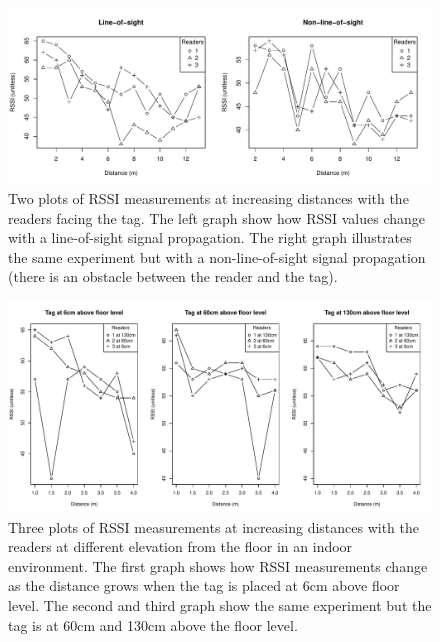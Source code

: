 \documentclass[a4paper,12pt]{article}
\begin{document}
\begin{figure}
	\begin{center}
		\includegraphics[width=1\textwidth]{rssi_distance_13m}
		\caption{Two plots of RSSI measurements at increasing distances with the readers facing the tag. The left graph show how RSSI values change with a line-of-sight signal propagation. The right graph illustrates the same experiment but with a non-line-of-sight signal propagation (there is an obstacle between the reader and the tag).}
	\end{center}
\end{figure}
\begin{figure}
	\begin{center}
		\includegraphics[width=1\textwidth]{rssi_distance_4m}
		\caption{Three plots of RSSI measurements at increasing distances with the readers at different elevation from the floor in an indoor environment. The first graph shows how RSSI measurements change as the distance grows when the tag is placed at 6cm above floor level. The second and third graph show the same experiment but the tag is at 60cm and 130cm above the floor level.}
	\end{center}
\end{figure}
\end{document}
